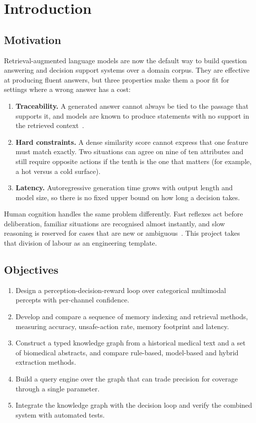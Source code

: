 \documentclass[12pt,a4paper,oneside]{report}
\begin{document}
\chapter{Introduction}
\section{Motivation}
Retrieval-augmented language models are now the default way to build question answering and decision support systems over a domain corpus. They are effective at producing fluent answers, but three properties make them a poor fit for settings where a wrong answer has a cost:
\begin{enumerate}
  \item \textbf{Traceability.} A generated answer cannot always be tied to the passage that supports it, and models are known to produce statements with no support in the retrieved context~\cite{ji2023hallucination}.
  \item \textbf{Hard constraints.} A dense similarity score cannot express that one feature must match exactly. Two situations can agree on nine of ten attributes and still require opposite actions if the tenth is the one that matters (for example, a hot versus a cold surface).
  \item \textbf{Latency.} Autoregressive generation time grows with output length and model size, so there is no fixed upper bound on how long a decision takes.
\end{enumerate}
Human cognition handles the same problem differently. Fast reflexes act before deliberation, familiar situations are recognised almost instantly, and slow reasoning is reserved for cases that are new or ambiguous~\cite{kahneman2011}. This project takes that division of labour as an engineering template.

\section{Objectives}
\begin{enumerate}
  \item Design a perception-decision-reward loop over categorical multimodal percepts with per-channel confidence.
  \item Develop and compare a sequence of memory indexing and retrieval methods, measuring accuracy, unsafe-action rate, memory footprint and latency.
  \item Construct a typed knowledge graph from a historical medical text and a set of biomedical abstracts, and compare rule-based, model-based and hybrid extraction methods.
  \item Build a query engine over the graph that can trade precision for coverage through a single parameter.
  \item Integrate the knowledge graph with the decision loop and verify the combined system with automated tests.
\end{enumerate}
\end{document}
